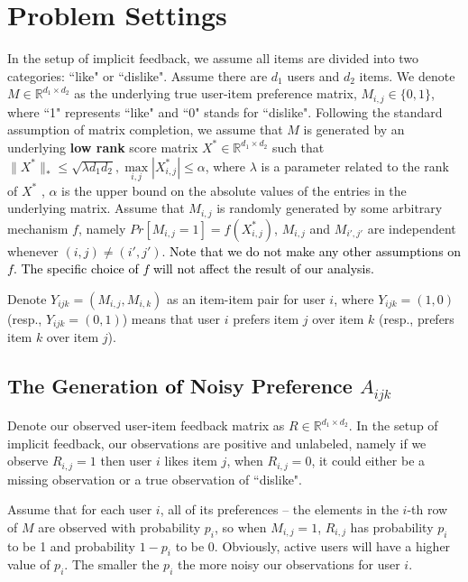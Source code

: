 \documentclass{article}
\numberwithin{equation}{section}
\newcommand{\laks}[1]{\textcolor{black}{#1}}
\newcommand{\R}{\mathbb{R}}
\newtheorem{sampling strategy}{Sampling Strategy}
\begin{document}
\section{Problem Settings}
\label{sec:prob}

In the setup of implicit feedback, we assume all items are divided into two categories:  ``like" or ``dislike". Assume there are $d_1$ users and $d_2$ items. We denote $M \in \R^{d_1 \times d_2}$ as the underlying true user-item preference matrix, $M_{i,j} \in \{0,1\}$, where ``1" represents ``like" and ``0" stands for ``dislike". Following the standard assumption of matrix completion, we assume that $M$ is generated by an underlying \textbf{low rank} score matrix $X^* \in \R^{d_1 \times d_2}$ such that $ \|X^*\|_* \leq \sqrt{\lambda d_1 d_2}, \underset{i,j}{\max} |X_{i,j}^*| \leq \alpha$, where $\lambda$ is a parameter related to the rank of $X^*$ \cite{cr}, $\alpha$ is the upper bound on the absolute values of the entries in the underlying matrix. 
Assume that $M_{i,j}$ is randomly generated by some arbitrary mechanism $f$, namely $Pr[M_{i,j} = 1] = f(X^*_{i,j})$, $M_{i,j}$ and $M_{i',j'}$ are independent whenever $(i,j) \neq (i',j')$. \laks{Note that we do not make any other assumptions on $f$. The specific choice of $f$ will not affect the result of our analysis.} 

Denote $Y_{ijk} = (M_{i,j}, M_{i,k})$ as an item-item pair for user $i$, where $Y_{ijk} = (1,0)$  (resp.,   $Y_{ijk} = (0,1)$) means that user $i$ prefers item $j$ over item $k$ (resp., prefers item $k$ over item $j$).  

\subsection{The Generation \laks{of} Noisy Preference $A_{ijk}$}

Denote our observed user-item feedback matrix as $R \in \R^{d_1 \times d_2}$. In the setup of implicit feedback, our observations are positive and unlabeled, namely if we observe $R_{i,j} = 1$ then user $i$ likes item $j$, when $R_{i,j} = 0$, it could either be a missing observation or a true observation of ``dislike". 

Assume that for each user $i$, all of its preferences -- the elements in the $i$-th row of $M$ are observed with probability $p_i$, so when $M_{i,j} = 1$, $R_{i,j}$ has probability $p_i$ to be 1 and probability $1-p_i$ to be 0. Obviously, active users  will have a higher value of $p_i$. The smaller the $p_i$ the more noisy  our observations for user $i$.
\end{document}
